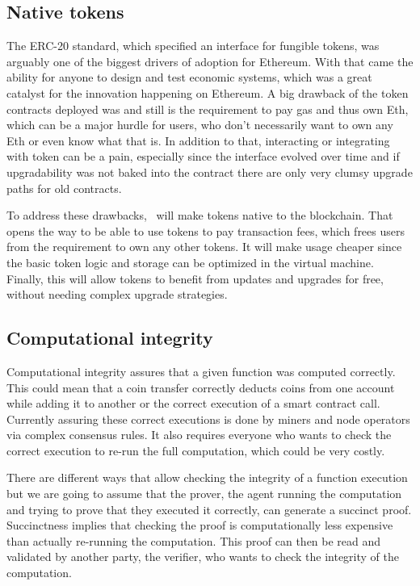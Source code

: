 \subsection{Native tokens}

The ERC-20 standard, which specified an interface for fungible tokens, was
arguably one of the biggest drivers of adoption for Ethereum. With that came
the ability for anyone to design and test economic systems, which was a great
catalyst for the innovation happening on Ethereum. A big drawback of the token
contracts deployed was and still is the requirement to pay gas and thus own
Eth, which can be a major hurdle for users, who don't necessarily want to own
any Eth or even know what that is. In addition to that, interacting or
integrating with token can be a pain, especially since the interface evolved
over time and if upgradability was not baked into the contract there are only
very clumsy upgrade paths for old contracts.

To address these drawbacks, \aet\ will make tokens native to the blockchain.
That opens the way to be able to use tokens to pay transaction fees, which
frees users from the requirement to own any other tokens. It will make usage
cheaper since the basic token logic and storage can be optimized in the virtual
machine. Finally, this will allow tokens to benefit from updates and upgrades
for free, without needing complex upgrade strategies.

\subsection{Computational integrity}

Computational integrity assures that a given function was computed correctly.
This could mean that a coin transfer correctly deducts coins from one account
while adding it to another or the correct execution of a smart contract call.
Currently assuring these correct executions is done by miners and node
operators via complex consensus rules. It also requires everyone who wants to
check the correct execution to re-run the full computation, which could be very
costly.

There are different ways that allow checking the integrity of a function
execution but we are going to assume that the prover, the agent running the
computation and trying to prove that they executed it correctly, can generate a
succinct proof. Succinctness implies that checking the proof is
computationally less expensive than actually re-running the computation. This
proof can then be read and validated by another party, the verifier, who wants
to check the integrity of the computation.

